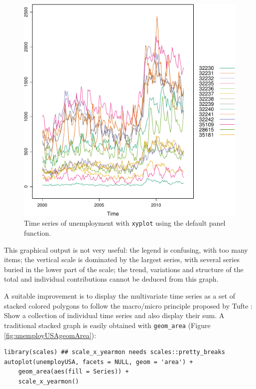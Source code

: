 \documentclass[smallroyalvopaper]{memoir}
\begin{document}
\begin{figure}[htbp]
\centering
\includegraphics[width=.9\linewidth]{figs/unemployUSAxyplot.pdf}
\caption{Time series of unemployment  with \texttt{xyplot} using the default panel function. \label{fig:unemployUSAxyplot}}
\end{figure}

This graphical output is not very useful: the legend is confusing,
with too many items; the vertical scale is dominated by the largest
series, with several series buried in the lower part of the scale; the
trend, variations and structure of the total and individual
contributions cannot be deduced from this graph.

A suitable improvement is to display the multivariate time series as a
set of stacked colored polygons to follow the macro/micro principle
proposed by Tufte \cite{Tufte1990}: Show a collection of individual
time series and also display their sum. A traditional stacked graph is
easily obtained with \texttt{geom\_area} (Figure \ref{fig:unemployUSAgeomArea}):

\lstset{language=r,label= ,caption= ,captionpos=b,numbers=none}
\begin{lstlisting}
library(scales) ## scale_x_yearmon needs scales::pretty_breaks
autoplot(unemployUSA, facets = NULL, geom = 'area') +
    geom_area(aes(fill = Series)) +
    scale_x_yearmon()  
\end{lstlisting}
\end{document}
